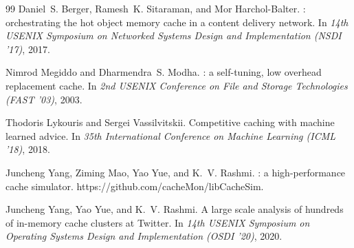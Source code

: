 \documentclass[letterpaper,twocolumn,10pt]{article}
\begin{document}
\begin{thebibliography}{99}
Daniel~S. Berger, Ramesh~K. Sitaraman, and Mor Harchol-Balter.
: orchestrating the hot object memory cache in a content
  delivery network.
\newblock In {\em 14th USENIX Symposium on Networked Systems Design and
  Implementation (NSDI '17)}, 2017.
 
Nimrod Megiddo and Dharmendra~S. Modha.
: a self-tuning, low overhead replacement cache.
\newblock In {\em 2nd USENIX Conference on File and Storage Technologies
  (FAST '03)}, 2003.
 
Thodoris Lykouris and Sergei Vassilvitskii.
\newblock Competitive caching with machine learned advice.
\newblock In {\em 35th International Conference on Machine Learning
  (ICML '18)}, 2018.
 
Juncheng Yang, Ziming Mao, Yao Yue, and K.~V. Rashmi.
: a high-performance cache simulator.
\newblock https://github.com/cacheMon/libCacheSim.
 
Juncheng Yang, Yao Yue, and K.~V. Rashmi.
\newblock A large scale analysis of hundreds of in-memory cache clusters at
  {Twitter}.
\newblock In {\em 14th USENIX Symposium on Operating Systems Design and
  Implementation (OSDI '20)}, 2020.
 
\end{thebibliography}
 
\end{document}
